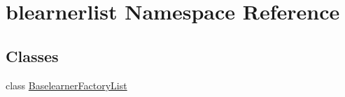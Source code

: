 \hypertarget{namespaceblearnerlist}{}\section{blearnerlist Namespace Reference}
\label{namespaceblearnerlist}
\subsection*{Classes}
\begin{DoxyCompactItemize}
\item 
class \hyperlink{classblearnerlist_1_1_baselearner_factory_list}{Baselearner\+Factory\+List}
\end{DoxyCompactItemize}
